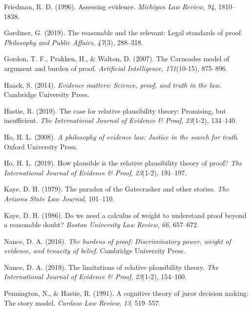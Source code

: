\documentclass[]{book}
\begin{document}
\leavevmode\hypertarget{ref-friedman1996}{}%
Friedman, R. D. (1996). Assessing evidence. \emph{Michigan Law Review}, \emph{94}, 1810--1838.

\leavevmode\hypertarget{ref-gardiner2019ppa}{}%
Gardiner, G. (2019). The reasonable and the relevant: Legal standards of proof. \emph{Philosophy and Public Affairs}, \emph{47}(3), 288--318.

\leavevmode\hypertarget{ref-gordon2007}{}%
Gordon, T. F., Prakken, H., \& Walton, D. (2007). The Carneades model of argument and burden of proof. \emph{Artificial Intelligence}, \emph{171}(10-15), 875--896.

\leavevmode\hypertarget{ref-Haack2014-HAAEMS}{}%
Haack, S. (2014). \emph{Evidence matters: Science, proof, and truth in the law}. Cambridge University Press.

\leavevmode\hypertarget{ref-hastie2019CaseRelativePlausibilitya}{}%
Hastie, R. (2019). The case for relative plausibility theory: Promising, but insufficient. \emph{The International Journal of Evidence \& Proof}, \emph{23}(1-2), 134--140.

\leavevmode\hypertarget{ref-ho2008philosophy}{}%
Ho, H. L. (2008). \emph{A philosophy of evidence law: Justice in the search for truth}. Oxford University Press.

\leavevmode\hypertarget{ref-lai2019HowPlausibleRelative}{}%
Ho, H. L. (2019). How plausible is the relative plausibility theory of proof? \emph{The International Journal of Evidence \& Proof}, \emph{23}(1-2), 191--197.

\leavevmode\hypertarget{ref-Kaye79gate}{}%
Kaye, D. H. (1979). The paradox of the Gatecrasher and other stories. \emph{The Arizona State Law Journal}, 101--110.

\leavevmode\hypertarget{ref-Kaye1986Do}{}%
Kaye, D. H. (1986). Do we need a calculus of weight to understand proof beyond a reasonable doubt? \emph{Boston University Law Review}, \emph{66}, 657--672.

\leavevmode\hypertarget{ref-nance2016}{}%
Nance, D. A. (2016). \emph{The burdens of proof: Discriminatory power, weight of evidence, and tenacity of belief}. Cambridge University Press.

\leavevmode\hypertarget{ref-nance2019LimitationsRelativePlausibility}{}%
Nance, D. A. (2019). The limitations of relative plausibility theory. \emph{The International Journal of Evidence \& Proof}, \emph{23}(1-2), 154--160.

\leavevmode\hypertarget{ref-Pennington1991}{}%
Pennington, N., \& Hastie, R. (1991). A cognitive theory of juror decision making: The story model. \emph{Cardozo Law Review}, \emph{13}, 519--557.
\end{document}
